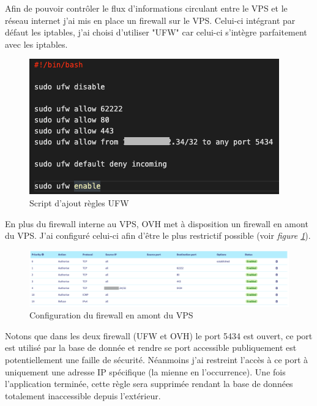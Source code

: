 \newparasm
\begin{minipage}{.5\textwidth}
  Afin de pouvoir contrôler le flux d'informations circulant entre le VPS et le réseau internet j'ai mis en place un firewall sur le VPS. Celui-ci intégrant par défaut les iptables\footnotemark, j'ai choisi d'utiliser "UFW" car celui-ci s'intègre parfaitement avec les iptables.  
\end{minipage}
\begin{minipage}{.5\textwidth}
  \begin{figure}[H]
    \centering
    \includegraphics[width=0.8\linewidth]{img/ufw-script.png}
    \caption{Script d'ajout règles UFW}
  \end{figure}
\end{minipage}


\newparasm
En plus du firewall interne au VPS, OVH met à disposition un firewall en amont du VPS. J'ai configuré celui-ci afin d'être le plus restrictif possible (voir \textit{figure \ref{VPS-firewall}}).
\begin{figure}[H]
  \centering
  \includegraphics[width=\linewidth]{img/ovh-fireWall.png}
  \caption{Configuration du firewall en amont du VPS}
  \label{VPS-firewall}
\end{figure}

\newpara
\newpara

Notons que dans les deux firewall (UFW et OVH) le port 5434 est ouvert, ce port est utilisé par la base de donnée et rendre se port accessible publiquement est potentiellement une faille de sécurité. Néanmoins j'ai restreint l'accès à ce port à uniquement une adresse IP spécifique (la mienne en l'occurrence). Une fois l'application terminée, cette règle sera supprimée rendant la base de données totalement inaccessible depuis l'extérieur. 


